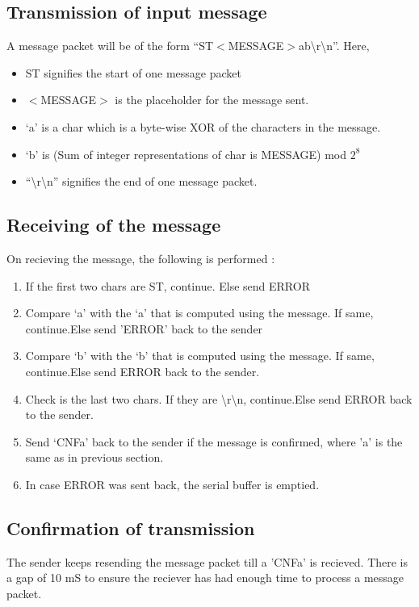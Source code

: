 \documentclass [a4paper,11pt]{article}
\begin{document}
\subsection{Transmission of input message}
A message packet will be of the form ``ST$<$MESSAGE$>$ab{\textbackslash}r{\textbackslash}n''. Here,
\begin{itemize}
\item ST signifies the start of one message packet
\item $<$MESSAGE$>$ is the placeholder for the message sent.
\item `a' is a char which is a byte-wise XOR of the characters in the message.
\item `b' is (Sum of integer representations of char is MESSAGE) mod $2^8$
\item ``{\textbackslash}r{\textbackslash}n'' signifies the end of one message packet.
\end{itemize}
\subsection{Receiving of the message}
On recieving the message, the following is performed :
\begin{enumerate}
\item If the first two chars are ST, continue. Else send ERROR
\item Compare `a' with the `a' that is computed using the message. If same, continue.Else send 'ERROR' back to the sender
\item Compare `b' with the `b' that is computed using the message. If same, continue.Else send ERROR back to the sender.
\item Check is the last two chars. If they are {\textbackslash}r{\textbackslash}n, continue.Else send ERROR back to the sender.
\item Send `CNFa' back to the sender if the message is confirmed, where 'a' is the same as in previous section.
\item In case ERROR was sent back, the serial buffer is emptied.
\end{enumerate}
\subsection{Confirmation of transmission}
The sender keeps resending the message packet till a 'CNFa' is recieved. There is a gap of 10 mS to ensure the reciever has had enough time to process a message packet.
\end{document}
